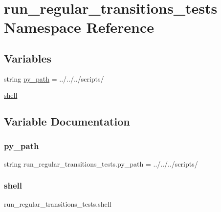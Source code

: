 \hypertarget{namespacerun__regular__transitions__tests}{}\section{run\+\_\+regular\+\_\+transitions\+\_\+tests Namespace Reference}
\label{namespacerun__regular__transitions__tests}
\subsection*{Variables}
\begin{DoxyCompactItemize}
\item 
string \hyperlink{namespacerun__regular__transitions__tests_afde1445844c10b978f1e5152438a35aa}{py\+\_\+path} = \textquotesingle{}../../../scripts/\textquotesingle{}
\item 
\hyperlink{namespacerun__regular__transitions__tests_a43354ef0b37c0e8765e6e00a1e07476c}{shell}
\end{DoxyCompactItemize}


\subsection{Variable Documentation}
\mbox{\label{namespacerun__regular__transitions__tests_afde1445844c10b978f1e5152438a35aa}} 
\subsubsection{\texorpdfstring{py\+\_\+path}{py\_path}}
{\footnotesize\ttfamily string run\+\_\+regular\+\_\+transitions\+\_\+tests.\+py\+\_\+path = \textquotesingle{}../../../scripts/\textquotesingle{}}

\mbox{\label{namespacerun__regular__transitions__tests_a43354ef0b37c0e8765e6e00a1e07476c}} 
\subsubsection{\texorpdfstring{shell}{shell}}
{\footnotesize\ttfamily run\+\_\+regular\+\_\+transitions\+\_\+tests.\+shell}

